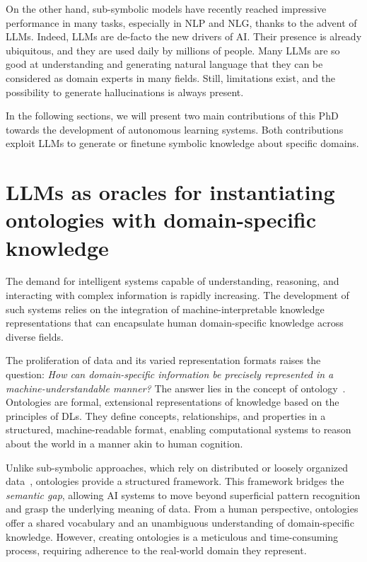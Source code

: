 On the other hand, sub-symbolic models have recently reached impressive performance in many tasks, especially in \gls{NLP} and \gls{NLG}, thanks to the advent of \glspl{LLM}.
%
Indeed, \glspl{LLM} are de-facto the new drivers of \gls{AI}.
%
Their presence is already ubiquitous, and they are used daily by millions of people.
%
Many \glspl{LLM} are so good at understanding and generating natural language that they can be considered as domain experts in many fields.
%
Still, limitations exist, and the possibility to generate hallucinations is always present.


In the following sections, we will present two main contributions of this PhD towards the development of autonomous learning systems.
%
Both contributions exploit \glspl{LLM} to generate or finetune symbolic knowledge about specific domains.



\section{\Glspl{LLM} as oracles for instantiating ontologies with domain-specific knowledge}
\label{sec:llm-as-oracles-for-instantiating-ontologies-with-domain-specific-knowledge}
%
The demand for intelligent systems capable of understanding, reasoning, and interacting with complex information is rapidly increasing.
%
The development of such systems relies on the integration of machine-interpretable knowledge representations that can encapsulate human domain-specific knowledge across diverse fields.


The proliferation of data and its varied representation formats raises the question: \emph{How can domain-specific information be precisely represented in a machine-understandable manner?}
%
The answer lies in the concept of ontology~\cite{DBLP:books/daglib/p/Grimm10}.
%
Ontologies are formal, extensional representations of knowledge based on the principles of \glspl{DL}.
%
They define concepts, relationships, and properties in a structured, machine-readable format, enabling computational systems to reason about the world in a manner akin to human cognition.


Unlike sub-symbolic approaches, which rely on distributed or loosely organized data~\cite{placeholder}, ontologies provide a structured framework.
%
This framework bridges the \emph{semantic gap}, allowing \gls{AI} systems to move beyond superficial pattern recognition and grasp the underlying meaning of data.
%
From a human perspective, ontologies offer a shared vocabulary and an unambiguous understanding of domain-specific knowledge.
%
However, creating ontologies is a meticulous and time-consuming process, requiring adherence to the real-world domain they represent.


